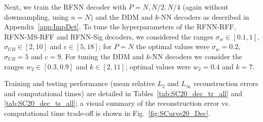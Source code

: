 \documentclass{article}
\begin{document}
Next, we train the RFNN decoder with $P=N,N/2,N/4$ (again without downsampling, using $n=N$) and the DDM and $k$-NN decoders as described in Appendix~\ref{app:ImpDet}. To tune the hyperparameters of the RFNN-RFF, RFNN-MS-RFF and RFNN-Sig decoders, we considered the ranges $\sigma_w\in[0.1,1]$, $\sigma_{UB}\in[2,10]$ and $c \in [5,18]$; for $P=N$ the optimal values were $\sigma_w=0.2$, $\sigma_{UB}=5$ and $c=9$. For tuning the DDM and $k$-NN decoders we consider the ranges $w_2\in[0.3,0.9]$ and $k\in[2,11]$; optimal values were $w_2=0.4$ and $k=7$.

Training and testing performance (mean relative $L_2$ and $L_\infty$ reconstruction errors and computational times) are detailed in Tables~\ref{tab:SC20_dec_tr_all} and \ref{tab:SC20_dec_ts_all}; a visual summary of the reconstruction error vs. computational time trade-off is shown in Fig.~\ref{fig:SCurve20_Dec}.
\end{document}

